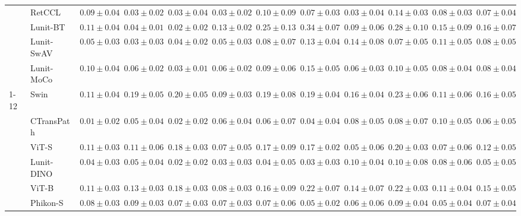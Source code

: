 \begin{tabular}{ll|cccc|c|cccc|c}
 & RetCCL~\cite{wang2023retccl} & $0.09 \pm 0.04$ & $0.03 \pm 0.02$ & $0.03 \pm 0.04$ & $0.03 \pm 0.02$ & $0.10 \pm 0.09$ & $0.07 \pm 0.03$ & $0.03 \pm 0.04$ & $0.14 \pm 0.03$ & $0.08 \pm 0.03$ & $0.07 \pm 0.04$ \\
 & Lunit-BT~\cite{kang2023benchmarking} & $0.11 \pm 0.04$ & $0.04 \pm 0.01$ & $\mathbf{0.02 \pm 0.02}$ & $0.13 \pm 0.02$ & $0.25 \pm 0.13$ & $0.34 \pm 0.07$ & $0.09 \pm 0.06$ & $0.28 \pm 0.10$ & $0.15 \pm 0.09$ & $0.16 \pm 0.07$ \\
 & Lunit-SwAV~\cite{kang2023benchmarking} & $0.05 \pm 0.03$ & $0.03 \pm 0.03$ & $0.04 \pm 0.02$ & $0.05 \pm 0.03$ & $0.08 \pm 0.07$ & $0.13 \pm 0.04$ & $0.14 \pm 0.08$ & $0.07 \pm 0.05$ & $0.11 \pm 0.05$ & $0.08 \pm 0.05$ \\
 & Lunit-MoCo~\cite{kang2023benchmarking} & $0.10 \pm 0.04$ & $0.06 \pm 0.02$ & $0.03 \pm 0.01$ & $0.06 \pm 0.02$ & $0.09 \pm 0.06$ & $0.15 \pm 0.05$ & $0.06 \pm 0.03$ & $0.10 \pm 0.05$ & $0.08 \pm 0.04$ & $0.08 \pm 0.04$ \\
\cline{1-12}
\multirow[t]{12}{*}{Transformer} & Swin~\cite{liu2021swin} & $0.11 \pm 0.04$ & $0.19 \pm 0.05$ & $0.20 \pm 0.05$ & $0.09 \pm 0.03$ & $0.19 \pm 0.08$ & $0.19 \pm 0.04$ & $0.16 \pm 0.04$ & $0.23 \pm 0.06$ & $0.11 \pm 0.06$ & $0.16 \pm 0.05$ \\
 & CTransPath~\cite{wang2022transformer} & $\mathbf{0.01 \pm 0.02}$ & $0.05 \pm 0.04$ & $\mathbf{0.02 \pm 0.02}$ & $0.06 \pm 0.04$ & $0.06 \pm 0.07$ & $0.04 \pm 0.04$ & $0.08 \pm 0.05$ & $0.08 \pm 0.07$ & $0.10 \pm 0.05$ & $0.06 \pm 0.05$ \\
 & ViT-S~\cite{kolesnikov2021image} & $0.11 \pm 0.03$ & $0.11 \pm 0.06$ & $0.18 \pm 0.03$ & $0.07 \pm 0.05$ & $0.17 \pm 0.09$ & $0.17 \pm 0.02$ & $0.05 \pm 0.06$ & $0.20 \pm 0.03$ & $0.07 \pm 0.06$ & $0.12 \pm 0.05$ \\
 & Lunit-DINO~\cite{kang2023benchmarking} & $0.04 \pm 0.03$ & $0.05 \pm 0.04$ & $0.02 \pm 0.02$ & $0.03 \pm 0.03$ & $\mathbf{0.04 \pm 0.05}$ & $\mathbf{0.03 \pm 0.03}$ & $0.10 \pm 0.04$ & $0.10 \pm 0.08$ & $0.08 \pm 0.06$ & $\mathbf{0.05 \pm 0.05}$ \\
 & ViT-B~\cite{kolesnikov2021image} & $0.11 \pm 0.03$ & $0.13 \pm 0.03$ & $0.18 \pm 0.03$ & $0.08 \pm 0.03$ & $0.16 \pm 0.09$ & $0.22 \pm 0.07$ & $0.14 \pm 0.07$ & $0.22 \pm 0.03$ & $0.11 \pm 0.04$ & $0.15 \pm 0.05$ \\
 & Phikon-S~\cite{filiot2023scaling} & $0.08 \pm 0.03$ & $0.09 \pm 0.03$ & $0.07 \pm 0.03$ & $0.07 \pm 0.03$ & $0.07 \pm 0.06$ & $0.05 \pm 0.02$ & $0.06 \pm 0.06$ & $0.09 \pm 0.04$ & $0.05 \pm 0.04$ & $0.07 \pm 0.04$ \\

\end{tabular}

